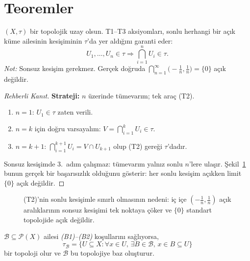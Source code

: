 \section{Teoremler}

\begin{theorem}
\label{thm:axiom_sufficiency}
$(X, \tau)$ bir topolojik uzay olsun. T1--T3 aksiyomları, sonlu herhangi bir açık küme
ailesinin kesişiminin $\tau$'da yer aldığını garanti eder:
\[
  U_1, \ldots, U_n \in \tau \Rightarrow \bigcap_{i=1}^{n} U_i \in \tau.
\]
\textit{Not:} Sonsuz kesişim gerekmez. Gerçek doğruda
$\bigcap_{n=1}^{\infty}\bigl(-\tfrac{1}{n}, \tfrac{1}{n}\bigr) = \{0\}$
açık değildir.
\end{theorem}

\begin{proof}[Rehberli Kanıt]
\textbf{Strateji:} $n$ üzerinde tümevarım; tek araç (T2).
\begin{enumerate}
  \item $n=1$: $U_1\in\tau$ zaten verili.
  \item $n=k$ için doğru varsayalım: $V=\bigcap_{i=1}^{k}U_i\in\tau$.
  \item $n=k+1$: $\bigcap_{i=1}^{k+1}U_i = V\cap U_{k+1}$ olup (T2)
        gereği $\tau$'dadır.
\end{enumerate}
Sonsuz kesişimde 3.~adım çalışmaz: tümevarım yalnız sonlu $n$'lere
ulaşır. Şekil~\ref{fig:ch04:kesisim} bunun gerçek bir başarısızlık
olduğunu gösterir: her sonlu kesişim açıkken limit $\{0\}$ açık değildir.
\end{proof}

\begin{figure}[ht]
  \centering
  
  \caption{(T2)'nin sonlu kesişimle sınırlı olmasının nedeni: iç içe
    $(-\tfrac1n,\tfrac1n)$ açık aralıklarının sonsuz kesişimi tek
    noktaya çöker ve $\{0\}$ standart topolojide açık değildir.}
  \label{fig:ch04:kesisim}
\end{figure}

\begin{theorem}
\label{thm:basis}
$\mathcal{B} \subseteq \mathcal{P}(X)$ ailesi \emph{(B1)--(B2)} koşullarını sağlıyorsa,
\[
  \tau_{\mathcal{B}}
  = \bigl\{U \subseteq X : \forall x \in U,\, \exists B \in \mathcal{B},\,
    x \in B \subseteq U\bigr\}
\]
bir topoloji olur ve $\mathcal{B}$ bu topolojiye baz oluşturur.
\end{theorem}

